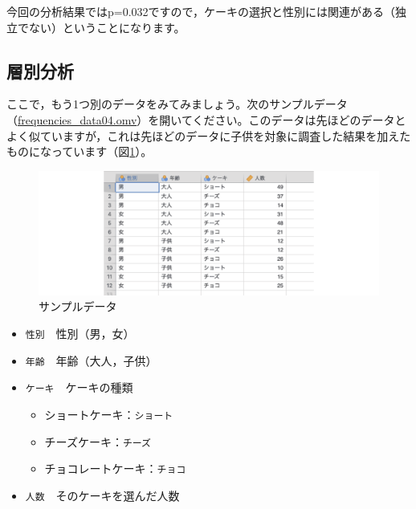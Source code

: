 \documentclass[
  12pt,
  a5jpaper,
  lualatex, ja=standard]{bxjsbook}
\providecommand{\tightlist}{%
  \setlength{\itemsep}{0pt}\setlength{\parskip}{0pt}}
\newenvironment{jmvvar}{%
	\begin{center}%
	\begin{tcolorbox}[%
		title=変数一覧,
		colframe=daidai,
		colbacktitle=daidai!30!white,
		coltitle=daidai!10!black,
		colback=daidai!2!white,
		breakable,
		width=.9\textwidth
		]\small\addtolength{\leftmargini}{-3\labelsep}%
	}%
	{\end{tcolorbox}\end{center}}
\begin{document}
今回の分析結果ではp=0.032ですので，ケーキの選択と性別には関連がある（独立でない）ということになります。

\hypertarget{sub:frequencies-chisq-layered}{%
\subsection{層別分析}\label{sub:frequencies-chisq-layered}}

ここで，もう1つ別のデータをみてみましょう。次のサンプルデータ（\href{https://github.com/sbtseiji/jmv_compguide/raw/main/data/omv/frequencies_data04.omv}{frequencies\_data04.omv}）を開いてください。このデータは先ほどのデータとよく似ていますが，これは先ほどのデータに子供を対象に調査した結果を加えたものになっています（図\ref{fig:frequencies-data04}）。

\begin{figure}[!ht]

{\centering \includegraphics[width=1\linewidth]{images/frequencies/data04} 

}

\caption{サンプルデータ}\label{fig:frequencies-data04}
\end{figure}

\begin{jmvvar}

\begin{itemize}
\tightlist
\item
  \texttt{性別}　性別（男，女）
\item
  \texttt{年齢}　年齢（大人，子供）
\item
  \texttt{ケーキ}　ケーキの種類

  \begin{itemize}
  \tightlist
  \item
    ショートケーキ：\texttt{ショート}
  \item
    チーズケーキ：\texttt{チーズ}
  \item
    チョコレートケーキ：\texttt{チョコ}
  \end{itemize}
\item
  \texttt{人数}　そのケーキを選んだ人数
\end{itemize}

\end{jmvvar}
\end{document}
